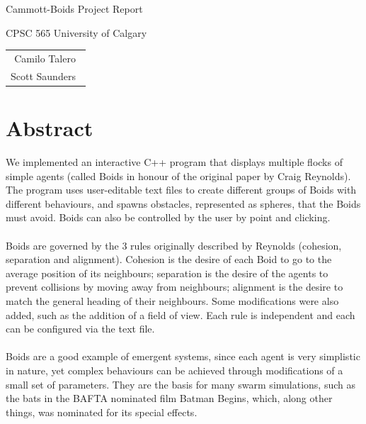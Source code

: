 \documentclass[12pt]{article}
\begin{document}
\thispagestyle{empty}
\begin{titlepage}
	\null\vfill
	
	\begin{center}
		
		{\Huge Cammott-Boids Project Report}
		\vskip 2cm
		
		{\large CPSC 565 University of Calgary}
	\end{center}
	
	\vfill
	\vfill
	
	\begin{tabular}{r}
		Camilo Talero\ \\
		Scott Saunders\    
	\end{tabular}
	\hfill
\end{titlepage}

	
\newpage
\clearpage
\setcounter{page}{1}

\section*{Abstract}

\indent We implemented an interactive C++ program that displays multiple flocks of simple agents (called Boids in honour of the original paper by Craig Reynolds). The program uses user-editable text files to create different groups of Boids with different behaviours, and spawns obstacles, represented as spheres, that the Boids must avoid. Boids can also be controlled by the user by point and clicking.
\\ \\
Boids are governed by the 3 rules originally described by Reynolds (cohesion, separation and alignment). Cohesion is the desire of each Boid to go to the average position of its neighbours; separation is the desire of the agents to prevent collisions by moving away from neighbours; alignment is the desire to match the general heading of their neighbours. Some modifications were also added, such as the addition of a field of view. Each rule is independent and each can be configured via the text file.
\\ \\
Boids are a good example of emergent systems, since each agent is very simplistic in nature, yet complex behaviours can be achieved through modifications of a small set of parameters. They are the basis for many swarm simulations, such as the bats in the BAFTA nominated film Batman Begins, which, along other things, was nominated for its special effects.
\end{document}
